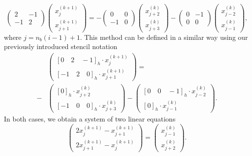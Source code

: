\begin{equation}
	\begin{pmatrix}
		2 & -1 \\
		-1 & 2
	\end{pmatrix}
	\begin{pmatrix}
		x_{j}^{(k+1)} \\ x_{j+1}^{(k+1)} 
	\end{pmatrix}
= 	-  \begin{pmatrix}
	0 & 0 \\
	-1 & 0
\end{pmatrix} 	
\begin{pmatrix}
x_{j+2}^{(k)} \\ x_{j+3}^{(k)}
\end{pmatrix} -
\begin{pmatrix}
	0 & -1 \\
	0 & 0
\end{pmatrix} 	
\begin{pmatrix}
	x_{j-2}^{(k)} \\ x_{j-1}^{(k)} 
\end{pmatrix},
\end{equation}
where $j = n_b (i - 1) + 1$.
This method can be defined in a similar way using our previously introduced stencil notation
\begin{equation}
\begin{split}
	& \begin{pmatrix}
		\left[0 \quad 2 \quad -1 \right]_{h} \cdot x_{j}^{(k+1)} \\ \left[ -1 \quad 2 \quad 0 \right]_{h} \cdot x_{j+1}^{(k+1)} 
	\end{pmatrix}
	= \\ - & 
	\begin{pmatrix}
		\left[ 0 \right]_{h} \cdot x_{j+2}^{(k)} \\ \left[-1 \quad 0 \quad 0 \right]_{h} \cdot x_{j + 3}^{(k)}
	\end{pmatrix} -
	\begin{pmatrix}
		\left[0 \quad 0 \quad -1 \right]_{h} \cdot x_{j-2}^{(k)} \\ \left[ 0 \right]_{h} \cdot x_{j-1}^{(k)} 
	\end{pmatrix}.
\end{split}
\end{equation}
In both cases, we obtain a system of two linear equations
\begin{equation}
	\begin{pmatrix}
		2 x_{j}^{(k+1)} - x_{j+1}^{(k+1)} \\ 2 x_{j+1}^{(k+1)} - x_{j}^{(k+1)} 
	\end{pmatrix}
	=
	\begin{pmatrix}
		x_{j - 1}^{(k)} \\ x_{j + 2}^{(k)}
	\end{pmatrix}.
\end{equation}
